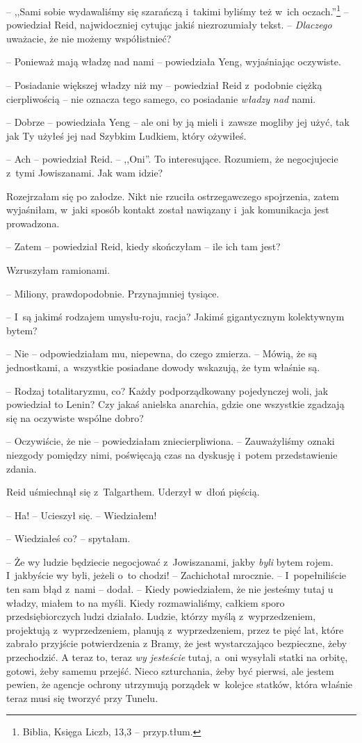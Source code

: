 \documentclass[oneside,polish,11pt,sfheadings]{mwbk}
\begin{document}
-- ,,Sami sobie wydawaliśmy się szarańczą i~takimi byliśmy też w~ich
oczach.''\footnote{ Biblia, Księga Liczb, 13,3 -- przyp.tłum.} -- powiedział
Reid, najwidoczniej cytując jakiś niezrozumiały tekst. -- \textit{Dlaczego}
uważacie, że nie możemy współistnieć?

-- Ponieważ mają władzę nad nami -- powiedziała Yeng, wyjaśniając
oczywiste.

-- Posiadanie większej władzy niż my -- powiedział Reid z~podobnie ciężką
cierpliwością -- nie oznacza tego samego, co posiadanie \textit{władzy nad}
nami.

-- Dobrze -- powiedziała Yeng -- ale oni by ją mieli i~zawsze mogliby jej użyć,
tak jak Ty użyłeś jej nad Szybkim Ludkiem, który ożywiłeś.

-- Ach -- powiedział Reid. -- ,,Oni''. To interesujące. Rozumiem, że
negocjujecie z~tymi Jowiszanami. Jak wam idzie?

Rozejrzałam się po załodze. Nikt nie rzuciła ostrzegawczego spojrzenia,
zatem wyjaśniłam, w~jaki sposób kontakt został nawiązany i~jak
komunikacja jest prowadzona.

-- Zatem -- powiedział Reid, kiedy skończyłam -- ile ich tam jest?

Wzruszyłam ramionami. 

-- Miliony, prawdopodobnie. Przynajmniej tysiące.

-- I~są jakimś rodzajem umysłu-roju, racja? Jakimś gigantycznym
kolektywnym bytem?

-- Nie -- odpowiedziałam mu, niepewna, do czego zmierza. -- Mówią, że są
jednostkami, a~wszystkie posiadane dowody wskazują, że tym właśnie są.

-- Rodzaj totalitaryzmu, co? Każdy podporządkowany pojedynczej woli, jak
powiedział to Lenin? Czy jakaś anielska anarchia, gdzie one wszystkie
zgadzają się na oczywiste wspólne dobro?

-- Oczywiście, że nie -- powiedziałam zniecierpliwiona. -- Zauważyliśmy
oznaki niezgody pomiędzy nimi, poświęcają czas na dyskusję i~potem
przedstawienie zdania.

Reid uśmiechnął się z~Talgarthem. Uderzył w~dłoń pięścią. 

-- Ha! -- Ucieszył się. -- Wiedziałem!

-- Wiedziałeś co? -- spytałam.

-- Że wy ludzie będziecie negocjować z~Jowiszanami, jakby \textit{byli}
bytem rojem. I~jakbyście wy byli, jeżeli o~to chodzi! -- Zachichotał
mrocznie. -- I~popełniliście ten sam błąd z~nami -- dodał. -- Kiedy
powiedziałem, że nie jesteśmy tutaj u władzy, miałem to na myśli. Kiedy
rozmawialiśmy, całkiem sporo przedsiębiorczych ludzi działało. Ludzie,
którzy myślą z~wyprzedzeniem, projektują z~wyprzedzeniem, planują z~wyprzedzeniem, przez te pięć lat, które zabrało przyjście potwierdzenia
z Bramy, że jest wystarczająco bezpieczne, żeby przechodzić. A teraz to,
teraz \textit{wy jesteście }tutaj, a~oni wysyłali statki na orbitę,
gotowi, żeby samemu przejść. Nieco szturchania, żeby być pierwsi, ale
jestem pewien, że agencje ochrony utrzymują porządek w~kolejce statków,
która właśnie teraz musi się tworzyć przy Tunelu.
\end{document}
